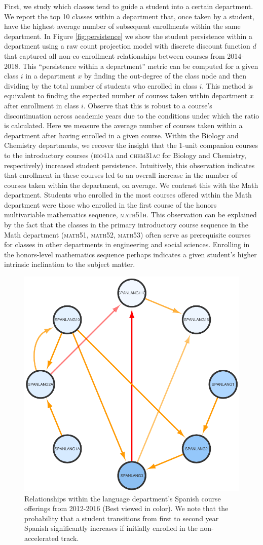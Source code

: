 \documentclass{sigchi}
\begin{document}
First, we study which classes tend to guide a student into a certain
department. We report the top 10 classes within a department that,
once taken by a student, have the highest average number of subsequent
enrollments within the same department. In Figure
\ref{fig:persistence} we show the student persistence within a
department using a raw count projection model with discrete discount
function $d$ that captured all non-co-enrollment relationships between
courses from 2014-2018.  This ``persistence within a department'' metric can be computed for a given class $i$ in a department $x$ by finding the out-degree of the class node and then dividing by the total number of students who enrolled in class $i$. This method is equivalent to finding the expected number of courses taken within department $x$ after enrollment in class $i$. Observe that this is robust to a course's discontinuation across academic years due to the conditions under which the ratio is calculated. Here we measure the
average number of courses taken within a department after having
enrolled in a given course. Within the Biology and Chemistry
departments, we recover the insight that the 1-unit companion courses
to the introductory courses (\textsc{bio41a} and \textsc{chem31ac} for Biology and
Chemistry, respectively) increased student persistence. Intuitively,
this observation indicates that enrollment in these courses led to an
overall increase in the number of courses taken within the department,
on average. We contrast this with the Math department. Students who
enrolled in the most courses offered within the Math department were
those who enrolled in the first course of the honors multivariable
mathematics sequence, \textsc{math51h}. This observation can be explained by the fact that the classes in the primary introductory course sequence in the Math department (\textsc{math51}, \textsc{math52}, \textsc{math53}) often serve as prerequisite courses for classes in other departments in engineering and social sciences. Enrolling in the honors-level mathematics sequence perhaps indicates a given student's higher intrinsic inclination to the subject matter.
\begin{figure}[h]
    \centering
    \includegraphics[width=0.4\columnwidth]{Figs/final-spanlang.pdf}  
    \caption{Relationships within the language department's Spanish course offerings from 2012-2016 (Best viewed in color). We note that the probability that a student transitions from first to second year Spanish significantly increases if initially enrolled in the non-accelerated track.}
    \label{fig:spanlang}
\end{figure}
\end{document}

